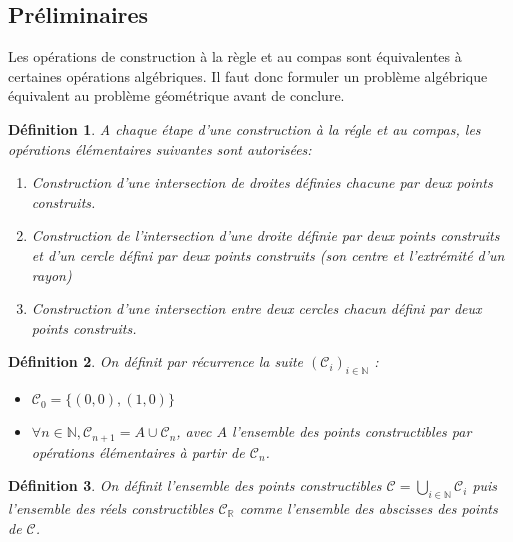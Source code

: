 \documentclass[a4paper,12pt,french]{report}
\newtheorem{definition}{Définition}[section]
\begin{document}
			\subsection{Préliminaires}
			Les opérations de construction à la règle et au compas sont équivalentes à certaines opérations algébriques. Il faut donc formuler un problème algébrique équivalent au problème géométrique avant de conclure.
			
			\begin{definition}
				A chaque étape d'une construction à la régle et au compas, les opérations élémentaires suivantes sont autorisées:
				\begin{enumerate}
					\item Construction d'une intersection de droites définies chacune par deux points construits.
					\item Construction de l'intersection d'une droite définie par deux points construits et d'un cercle défini par deux points construits (son centre et l'extrémité d'un rayon)
					\item Construction d'une intersection entre deux cercles chacun défini par deux points construits.
				\end{enumerate}
			\end{definition}
			
			\begin{definition}
				On définit par récurrence la suite \((\mathscr{C}_i)_{i \in \mathbb{N}} \) :
				
				
				
				\begin{itemize}
					\item \(\mathscr{C}_0 = \{(0, 0), (1, 0)\}\)
					\item \(\forall n \in \mathbb{N}, \mathscr{C}_{n+1} = A\cup \mathscr{C}_{n}\), avec \(A\) l'ensemble des points constructibles par opérations élémentaires à partir de \( \mathscr{C}_{n} \).
				\end{itemize}
			\end{definition}
			
			\begin{definition}
				On définit l'ensemble des points constructibles \(\mathscr{C} = \bigcup_{i \in \mathbb{N}} \mathscr{C}_i \) puis l'ensemble des réels constructibles \(\mathscr{C}_\mathbb{R}\) comme l'ensemble des abscisses des points de \( \mathscr{C} \).
			\end{definition}
				
\end{document}
